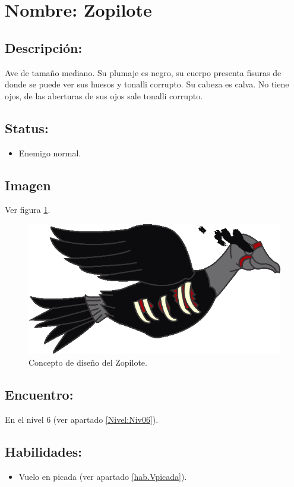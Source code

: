 \section{Nombre: Zopilote}   \label{per:zopilote}
\subsection{Descripción:}
Ave de tamaño mediano. Su plumaje es negro, su cuerpo presenta fisuras de donde se puede ver sus huesos y tonalli corrupto. Su cabeza es calva. No tiene ojos, de las aberturas de sus ojos sale tonalli corrupto. 
\subsection{Status:}
\begin{itemize}
	\item Enemigo normal.
\end{itemize}
\subsection{Imagen}
Ver figura \ref{fig:zopilote}.
\begin{figure}
	\centering
	\includegraphics[height=0.2 \textheight]{Imagenes/zopilote}
	\caption{Concepto de diseño del Zopilote.}
	\label{fig:zopilote}
\end{figure}
\subsection{Encuentro:}
En el nivel 6 (ver apartado \ref{Nivel:Niv06}).
\subsection{Habilidades:}
\begin{itemize}
	\item Vuelo en picada (ver apartado \ref{hab.Vpicada}).
\end{itemize}
